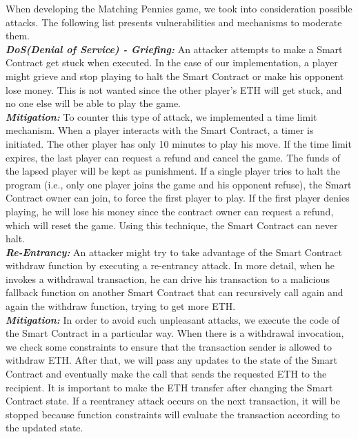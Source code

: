 \documentclass[12pt,a4paper]{article}
\begin{document}
When developing the Matching Pennies game, we took into consideration possible attacks.
The following list presents vulnerabilities and mechanisms to moderate them. \\

\textbf{\emph{DoS(Denial of Service) - Griefing: }}An attacker attempts to make a Smart Contract get stuck when executed. In the case of our implementation, a player might grieve and stop playing to halt the Smart Contract or make his opponent lose money. This is not wanted since the other player’s ETH will get stuck, and no one else will be able to play the game. \\

\textbf{\emph{Mitigation: }}To counter this type of attack, we implemented a
time limit mechanism. When a player interacts with the Smart Contract, a timer
is initiated. The other player has only 10 minutes to play his move. If the time
limit expires, the last player can request a refund and cancel the game. The
funds of the lapsed player will be kept as punishment. If a single player tries
to halt the program (i.e., only one player joins the game and his opponent
refuse), the Smart Contract owner can join, to force the first player to play.
If the first player denies playing, he will lose his money since the contract
owner can request a refund, which will reset the game. Using this technique, the
Smart Contract can never halt.\\

\textbf{\emph{Re-Entrancy: }}An attacker might try to take advantage of the
Smart Contract withdraw function by executing a re-entrancy attack. In more
detail, when he invokes a withdrawal transaction, he can drive his transaction
to a malicious fallback function on another Smart Contract that can recursively
call again and again the withdraw function, trying to get more ETH.\\

\textbf{\emph{Mitigation: }}In order to avoid such unpleasant attacks, we
execute the code of the Smart Contract in a particular way. When there is a
withdrawal invocation, we check some constraints to ensure that the transaction
sender is allowed to withdraw ETH. After that, we will pass any updates to the
state of the Smart Contract and eventually make the call that sends the
requested ETH to the recipient. It is important to make the ETH transfer after
changing the Smart Contract state. If a reentrancy attack occurs on the next
transaction, it will be stopped because function constraints will evaluate the
transaction according to the updated state.\\
\end{document}
